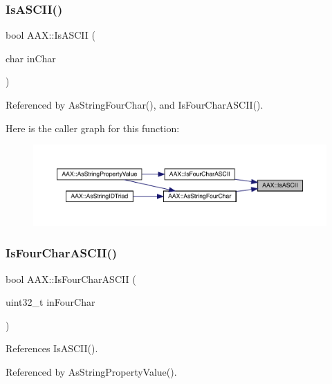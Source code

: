 \subsubsection{\texorpdfstring{IsASCII()}{IsASCII()}}
{\footnotesize\ttfamily bool A\+A\+X\+::\+Is\+A\+S\+C\+II (\begin{DoxyParamCaption}\item[{char}]{in\+Char }\end{DoxyParamCaption})\hspace{0.3cm}{\ttfamily [inline]}}



Referenced by As\+String\+Four\+Char(), and Is\+Four\+Char\+A\+S\+C\+I\+I().

Here is the caller graph for this function\+:
\nopagebreak
\begin{figure}[H]
\begin{center}
\leavevmode
\includegraphics[width=350pt]{a00852_aa8ebc6a8ee1232c4ffec828bff3c2998_icgraph}
\end{center}
\end{figure}
\mbox{\label{a00852_a00fbf59b268ca75214b2dad68be8ff77}} 
\subsubsection{\texorpdfstring{IsFourCharASCII()}{IsFourCharASCII()}}
{\footnotesize\ttfamily bool A\+A\+X\+::\+Is\+Four\+Char\+A\+S\+C\+II (\begin{DoxyParamCaption}\item[{uint32\+\_\+t}]{in\+Four\+Char }\end{DoxyParamCaption})\hspace{0.3cm}{\ttfamily [inline]}}



References Is\+A\+S\+C\+I\+I().



Referenced by As\+String\+Property\+Value().

